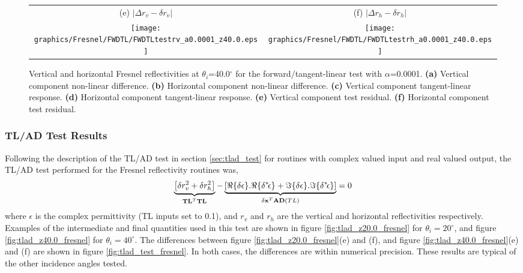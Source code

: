 \begin{figure}[htp]
\begin{tabular}{c c}
    \textsf{(e)} $|\Delta r_v - \delta r_v|$ &
    \textsf{(f)} $|\Delta r_h - \delta r_h|$ \\
    \texttt{[image: graphics/Fresnel/FWDTL/FWDTLtestrv\_a0.0001\_z40.0.eps]} & 
    \texttt{[image: graphics/Fresnel/FWDTL/FWDTLtestrh\_a0.0001\_z40.0.eps]}
  \end{tabular}
  \caption{Vertical and horizontal Fresnel reflectivities at $\theta_i$=40.0$^\circ$ for the forward/tangent-linear test with $\alpha$=0.0001. \textbf{(a)} Vertical component non-linear difference.  \textbf{(b)} Horizontal component non-linear difference. \textbf{(c)} Vertical component tangent-linear response. \textbf{(d)} Horizontal component tangent-linear response. \textbf{(e)} Vertical component test residual. \textbf{(f)} Horizontal component test residual.}
  \label{fig:fwdtl_a0.0001_fresnel}
\end{figure}


\subsubsection{TL/AD Test Results}
Following the description of the TL/AD test in section \ref{sec:tlad_test} for routines with complex valued input and real valued output, the TL/AD test performed for the Fresnel reflectivity routines was,
\begin{equation}
  \underbrace{\left[\delta r_{v}^2 + \delta r_{h}^2\right]}_{\mathbf{TL}^{T}\mathbf{TL}} - \underbrace{\left[\Re\{\delta\epsilon\}.\Re\{\delta^{*}\! \epsilon\} + \Im\{\delta\epsilon\}.\Im\{\delta^{*}\! \epsilon\}\right]}_{\mathbf{\delta x}^{T}\mathbf{AD}(TL)} = 0
  \label{eqn:tlad_fresnel}
\end{equation}
where $\epsilon$ is the complex permittivity (TL inputs set to 0.1), and $r_v$ and $r_h$ are the vertical and horizontal reflectivities respectively. Examples of the intermediate and final quantities used in this test are shown in figure \ref{fig:tlad_z20.0_fresnel} for $\theta_{i} = 20^{\circ}$, and figure \ref{fig:tlad_z40.0_fresnel} for $\theta_{i} = 40^{\circ}$. The differences between figure \ref{fig:tlad_z20.0_fresnel}(e) and (f), and figure \ref{fig:tlad_z40.0_fresnel}(e) and (f) are shown in figure \ref{fig:tlad_test_fresnel}. In both cases, the differences are within numerical precision. These results are typical of the other incidence angles tested.

